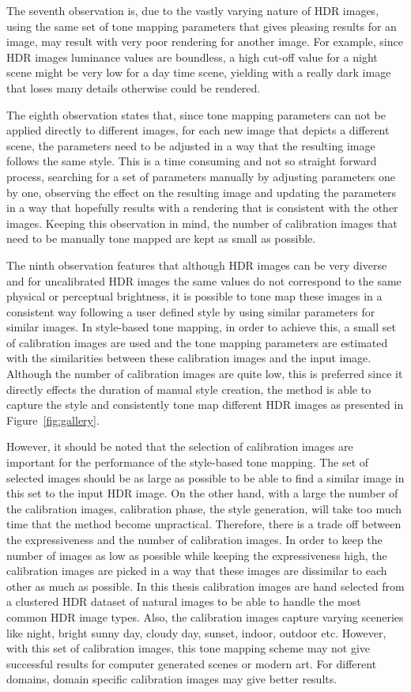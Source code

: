 The seventh observation is, due to the vastly varying nature of HDR images, using the same set of tone mapping parameters that gives pleasing results for an image, may result with very poor rendering for another image. For example, since HDR images luminance values are boundless, a high cut-off value for a night scene might be very low for a day time scene, yielding with a really dark image that loses many details otherwise could be rendered.

The eighth observation states that, since tone mapping parameters can not be applied directly to different images, for each new image that depicts a different scene, the parameters need to be adjusted in a way that the resulting image follows the same style. This is a time consuming and not so straight forward process, searching for a set of parameters manually by adjusting parameters one by one, observing the effect on the resulting image and updating the parameters in a way that hopefully results with a rendering that is consistent with the other images. Keeping this observation in mind, the number of calibration images that need to be manually tone mapped are kept as small as possible.

The ninth observation features that although HDR images can be very diverse and for uncalibrated HDR images the same values do not correspond to the same physical or perceptual brightness, it is possible to tone map these images in a consistent way following a user defined style by using similar parameters for similar images. In style-based tone mapping, in order to achieve this, a small set of calibration images are used and the tone mapping parameters are estimated with the similarities between these calibration images and the input image. Although the number of calibration images are quite low, this is preferred since it directly effects the duration of manual style creation, the method is able to capture the style and consistently tone map different HDR images as presented in Figure~\ref{fig:gallery}. 

However, it should be noted that the selection of calibration images are important for the performance of the style-based tone mapping. The set of selected images should be as large as possible to be able to find a similar image in this set to the input HDR image. On the other hand, with a large the number of the calibration images, calibration phase, the style generation, will take too much time that the method become unpractical. Therefore, there is a trade off between the expressiveness and the number of calibration images. In order to keep the number of images as low as possible while keeping the expressiveness high, the calibration images are picked in a way that these images are dissimilar to each other as much as possible. In this thesis calibration images are hand selected from a clustered HDR dataset of natural images to be able to handle the most common HDR image types. Also, the calibration images capture varying sceneries like night, bright sunny day, cloudy day, sunset, indoor, outdoor etc. However, with this set of calibration images, this tone mapping scheme may not give successful results for computer generated scenes or modern art. For different domains, domain specific calibration images may give better results.

